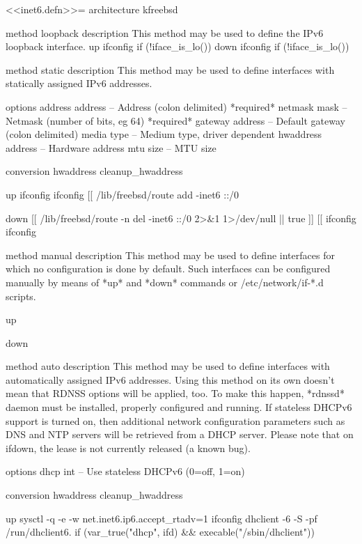 \documentclass{article}
\begin{document}
<<inet6.defn>>=
architecture kfreebsd

method loopback
  description
    This method may be used to define the IPv6 loopback interface.
  up
    ifconfig %
	if (!iface_is_lo())
  down
    ifconfig %
	if (!iface_is_lo())

method static
  description
    This method may be used to define interfaces with statically assigned
    IPv6 addresses.

  options
    address address        -- Address (colon delimited) *required*
    netmask mask           -- Netmask (number of bits, eg 64) *required*
    gateway address        -- Default gateway (colon delimited)
    media type             -- Medium type, driver dependent
    hwaddress address      -- Hardware address
    mtu size               -- MTU size

  conversion
    hwaddress cleanup_hwaddress

  up
    ifconfig %
    ifconfig %
    [[ /lib/freebsd/route add -inet6 ::/0 %

  down
    [[ /lib/freebsd/route -n del -inet6 ::/0 2>&1 1>/dev/null || true ]]
    [[ ifconfig %
    ifconfig %

method manual
  description
    This method may be used to define interfaces for which no configuration
    is done by default.  Such interfaces can be configured manually by
    means of *up* and *down* commands or /etc/network/if-*.d scripts.

  up

  down

method auto
  description
    This method may be used to define interfaces with automatically assigned
    IPv6 addresses. Using this method on its own doesn't mean that RDNSS options
    will be applied, too. To make this happen, *rdnssd* daemon must be installed,
    properly configured and running.
    If stateless DHCPv6 support is turned on, then additional network
    configuration parameters such as DNS and NTP servers will be retrieved
    from a DHCP server. Please note that on ifdown, the lease is not currently
    released (a known bug).

  options
    dhcp int               -- Use stateless DHCPv6 (0=off, 1=on)

  conversion
    hwaddress cleanup_hwaddress

  up
    sysctl -q -e -w net.inet6.ip6.accept_rtadv=1
    ifconfig %
    dhclient -6 -S -pf /run/dhclient6.%
        if (var_true("dhcp", ifd) && execable("/sbin/dhclient"))
\end{document}
